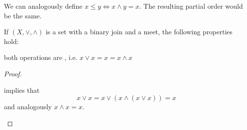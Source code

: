 \begin{remark}\label{remark:binary_join_meet_order}
  We can analogously define \( x \leq y \iff x \wedge y = x \). The resulting partial order would be the same.
\end{remark}

\begin{proposition}\label{thm:binary_join_meet_properties}
  If \( (X, \vee, \wedge) \) is a set with a binary join and a meet, the following properties hold:
  \begin{defenum}
     both operations are , i.e. \( x \vee x = x = x \wedge x \)
  \end{defenum}
\end{proposition}
\begin{proof}\mbox{}
  \begin{description}
      implies that
    \begin{equation*}
      x \vee x = x \vee (x \wedge (x \vee x)) = x
    \end{equation*}
    and analogously \( x \wedge x = x \).
  \end{description}
\end{proof}

